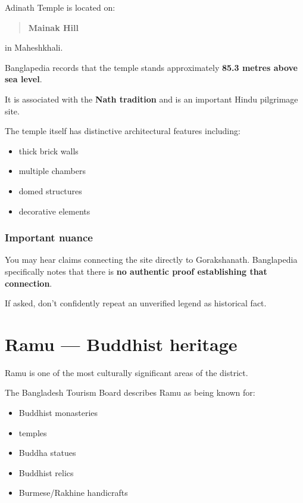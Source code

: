 Adinath Temple is located on:

\begin{quote}
\textbf{Mainak Hill}\\
\end{quote}

in Maheshkhali.

Banglapedia records that the temple stands approximately \textbf{85.3 metres above sea level}.

It is associated with the \textbf{Nath tradition} and is an important Hindu pilgrimage site.

The temple itself has distinctive architectural features including:

\begin{itemize}
  \item thick brick walls
  \item multiple chambers
  \item domed structures
  \item decorative elements
\end{itemize}



\subsubsection{Important nuance}

You may hear claims connecting the site directly to Gorakshanath. Banglapedia specifically notes that there is \textbf{no authentic proof establishing that connection}.

If asked, don't confidently repeat an unverified legend as historical fact.

\medskip

\section{Ramu --- Buddhist heritage}

Ramu is one of the most culturally significant areas of the district.

The Bangladesh Tourism Board describes Ramu as being known for:

\begin{itemize}
  \item Buddhist monasteries
  \item temples
  \item Buddha statues
  \item Buddhist relics
  \item Burmese/Rakhine handicrafts
\end{itemize}



